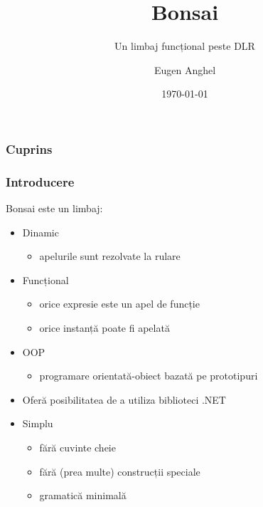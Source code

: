 \documentclass{beamer}
\title[Bonsai - un limbaj funcțional peste DLR]{Bonsai}
\subtitle{Un limbaj funcțional peste DLR}
\author{Eugen Anghel}
\institute{Coordonator științific  \\Profesor Doctor Gheorghe Grigoraș}
\date{\today}
\begin{document}
\frame{\titlepage}

\begin{frame}
  \frametitle{Cuprins}
  \tableofcontents
\end{frame}

\begin{frame}
  \frametitle{Introducere}
  Bonsai este un limbaj:
  \begin{itemize}
  \item 
    Dinamic
    \begin{itemize}
      \item apelurile sunt rezolvate la rulare
    \end{itemize}
  \item 
    Funcțional
    \begin{itemize}
    \item orice expresie este un apel de funcție
    \item orice instanță poate fi apelată
    \end{itemize}
  \item 
    OOP
    \begin{itemize}
    \item programare orientată-obiect bazată pe prototipuri
    \end{itemize}
  \item
    Oferă posibilitatea de a utiliza biblioteci .NET
  \item
    Simplu
    \begin{itemize}
    \item fără cuvinte cheie
    \item fără (prea multe) construcții speciale
    \item gramatică minimală
    \end{itemize}
  \end{itemize}
\end{frame}
\end{document}
